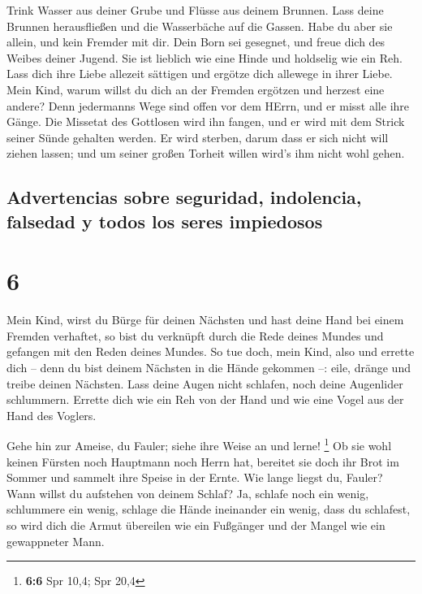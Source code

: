  Trink Wasser aus deiner Grube und Flüsse aus deinem
Brunnen.  Lass deine Brunnen herausfließen und die
Wasserbäche auf die Gassen.  Habe du aber sie allein, und
kein Fremder mit dir.  Dein Born sei gesegnet, und freue
dich des Weibes deiner Jugend.  Sie ist lieblich wie eine
Hinde und holdselig wie ein Reh. Lass dich ihre Liebe allezeit sättigen
und ergötze dich allewege in ihrer Liebe.  Mein Kind,
warum willst du dich an der Fremden ergötzen und herzest eine andere?
 Denn jedermanns Wege sind offen vor dem HErrn, und er
misst alle ihre Gänge.  Die Missetat des Gottlosen wird
ihn fangen, und er wird mit dem Strick seiner Sünde gehalten werden.
 Er wird sterben, darum dass er sich nicht will ziehen
lassen; und um seiner großen Torheit willen wird's ihm nicht wohl gehen.

\hypertarget{advertencias-sobre-seguridad-indolencia-falsedad-y-todos-los-seres-impiedosos}{%
\subsection{Advertencias sobre seguridad, indolencia, falsedad y todos
los seres
impiedosos}\label{advertencias-sobre-seguridad-indolencia-falsedad-y-todos-los-seres-impiedosos}}

\hypertarget{section-5}{%
\section{6}\label{section-5}}

 Mein Kind, wirst du Bürge für deinen Nächsten und hast
deine Hand bei einem Fremden verhaftet,  so bist du
verknüpft durch die Rede deines Mundes und gefangen mit den Reden deines
Mundes.  So tue doch, mein Kind, also und errette dich --
denn du bist deinem Nächsten in die Hände gekommen --: eile, dränge und
treibe deinen Nächsten.  Lass deine Augen nicht schlafen,
noch deine Augenlider schlummern.  Errette dich wie ein
Reh von der Hand und wie eine Vogel aus der Hand des Voglers.

 Gehe hin zur Ameise, du Fauler; siehe ihre Weise an und
lerne! \footnote{\textbf{6:6} Spr 10,4; Spr 20,4}  Ob sie
wohl keinen Fürsten noch Hauptmann noch Herrn hat, 
bereitet sie doch ihr Brot im Sommer und sammelt ihre Speise in der
Ernte.  Wie lange liegst du, Fauler? Wann willst du
aufstehen von deinem Schlaf?  Ja, schlafe noch ein wenig,
schlummere ein wenig, schlage die Hände ineinander ein wenig, dass du
schlafest,  so wird dich die Armut übereilen wie ein
Fußgänger und der Mangel wie ein gewappneter Mann.

